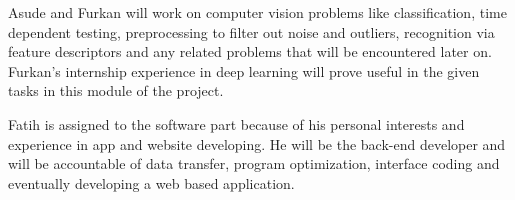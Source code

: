 Asude and Furkan will work on computer vision problems like classification, time dependent testing, preprocessing to filter out noise and outliers, recognition via feature descriptors and any related problems that will be encountered later on. Furkan's internship experience in deep learning will prove useful in the given tasks in this module of the project. 

Fatih is assigned to the software part because of his personal interests and experience in app and website developing. He will be the back-end developer and will be accountable of data transfer, program optimization, interface coding and eventually developing a web based application. 




